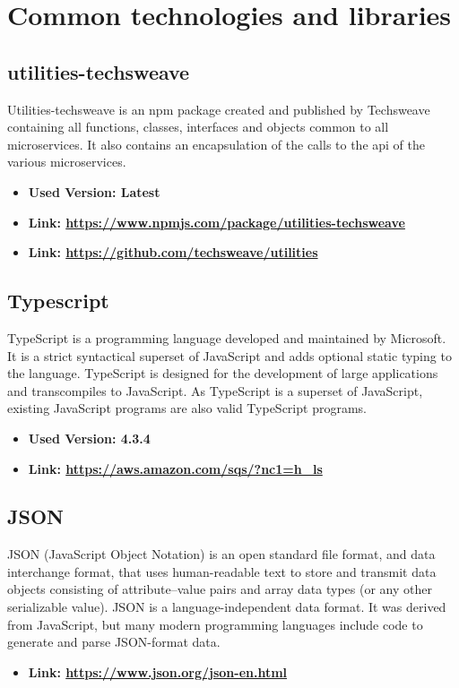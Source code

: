 \section{Common technologies and libraries}
\subsection{utilities-techsweave}
Utilities-techsweave is an npm package created and published by Techsweave containing all functions, classes, interfaces and objects common to all microservices. It also contains an encapsulation of the calls to the api of the various microservices.
\begin{itemize}
  \item \textbf{Used Version: Latest}
  \item \textbf{Link: \url{https://www.npmjs.com/package/utilities-techsweave}}
  \item \textbf{Link: \url{https://github.com/techsweave/utilities}}
\end{itemize}
\subsection{Typescript}
TypeScript is a programming language developed and maintained by Microsoft. It is a strict syntactical
superset of JavaScript and adds optional static typing to the language. TypeScript is designed for the
development of large applications and transcompiles to JavaScript. As TypeScript is a superset of JavaScript,
existing JavaScript programs are also valid TypeScript programs.
\begin{itemize}
  \item \textbf{Used Version: 4.3.4}
  \item \textbf{Link: \url{https://aws.amazon.com/sqs/?nc1=h_ls}}
\end{itemize}
\subsection{JSON}
JSON (JavaScript Object Notation) is an open standard file format, and data interchange format, that
uses human-readable text to store and transmit data objects consisting of attribute–value pairs and
array data types (or any other serializable value).
JSON is a language-independent data format. It was derived from JavaScript,
but many modern programming languages include code to generate and parse JSON-format data.
\begin{itemize}
  \item \textbf{Link: \url{https://www.json.org/json-en.html}}
\end{itemize}
